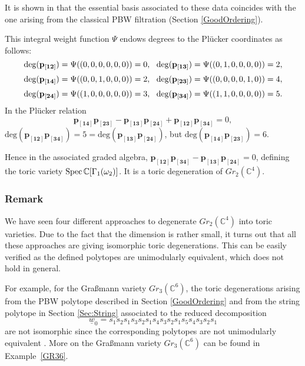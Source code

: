 \documentclass{emsprocart}
\theoremstyle{definition}
\begin{document}
It is shown in \cite{FFR} that the essential basis associated to these data coincides with the one arising from the classical PBW filtration (Section \ref{GoodOrdering}).
\par
This integral weight function $\Psi$ endows degrees to the Pl\"ucker coordinates as follows:
$$\textrm{deg}(\bold{p_{[12]}})=\Psi((0,0,0,0,0,0))=0,\ \ \textrm{deg}(\bold{p_{[13]}})=\Psi((0,1,0,0,0,0))=2,$$
$$\textrm{deg}(\bold{p_{[14]}})=\Psi((0,0,1,0,0,0))=2,\ \ \textrm{deg}(\bold{p_{[23]}})=\Psi((0,0,0,0,1,0))=4,$$
$$\textrm{deg}(\bold{p_{[24]}})=\Psi((1,0,0,0,0,0))=3,\ \ \textrm{deg}(\bold{p_{[34]}})=\Psi((1,1,0,0,0,0))=5.$$
In the Pl\"ucker relation
$$
\mathbf p_{\mathbf{[14]}} \mathbf p_\mathbf{[23]} -
\mathbf p_{\mathbf{[13]}}\mathbf p_{\mathbf{[24]}}+
\mathbf p_{\mathbf{[12]}}\mathbf p_{\mathbf{[34]}}=0,
$$
$\textrm{deg}(\mathbf p_{\mathbf{[12]}} \mathbf p_\mathbf{[34]})=5=\textrm{deg}(\mathbf p_{\mathbf{[13]}} \mathbf p_\mathbf{[24]})$, but $\textrm{deg}(\mathbf p_{\mathbf{[14]}} \mathbf p_\mathbf{[23]})=6$. 

Hence in the associated graded algebra, $\mathbf p_{\mathbf{[12]}}\mathbf p_{\mathbf{[34]}}-\mathbf p_{\mathbf{[13]}}\mathbf p_{\mathbf{[24]}}=0$, 
defining the toric variety $\text{Spec\,}\mathbb{C}[\Gamma_1(\omega_2)]$. It is a toric degeneration of $Gr_{2}(\mathbb C^4)$.

\subsubsection{Remark}
We have seen four different approaches to degenerate $Gr_{2}(\mathbb C^4)$ into toric varieties. 
Due to the fact that the dimension is rather small, it turns out that all these approaches are giving isomorphic toric degenerations. 
This can be easily verified as the defined polytopes are unimodularly equivalent, which does not hold in general.
\par
For example, for the Gra\ss mann variety $Gr_{3}(\mathbb C^6)$, the toric degenerations arising from the PBW polytope described in Section \ref{GoodOrdering} and from the string polytope in Section \ref{Sec:String} associated to the reduced decomposition
$$\underline{w}_0=s_1s_2s_1s_3s_2s_1s_4s_3s_2s_1s_5s_4s_3s_2s_1$$
are not isomorphic since the corresponding polytopes are not unimodularly equivalent \cite{Fo1}. More on the Gra\ss mann variety $Gr_{3}(\mathbb C^6)$ can be found in Example~\ref{GR36}.
\end{document}
